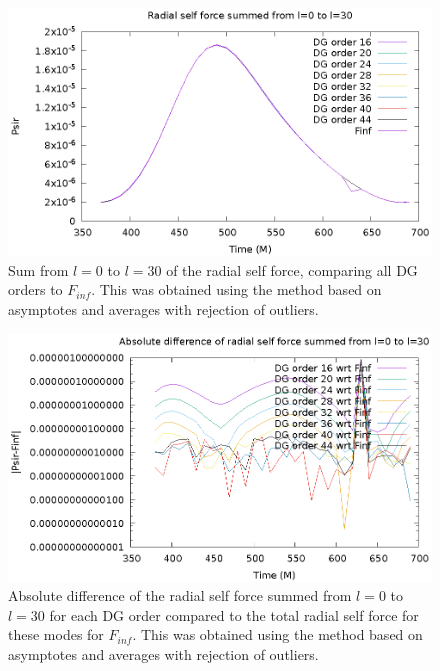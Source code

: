 \begin{figure}
\includegraphics{psirvtwfinfdgorders}
\caption{Sum from $l=0$ to $l=30$ of the radial self force, comparing all DG orders to $F_{inf}$. This was obtained using the method based on asymptotes and averages with rejection of outliers.}
\label{summixed}
\end{figure}

\begin{figure}
\includegraphics{absdiffpsirvtwfinfdgorders}
\caption{Absolute difference of the radial self force summed from $l=0$ to $l=30$  for each DG order compared to the total radial self force for these modes for $F_{inf}$. This was obtained using the method based on asymptotes and averages with rejection of outliers.}
\label{absmixed}
\end{figure}

